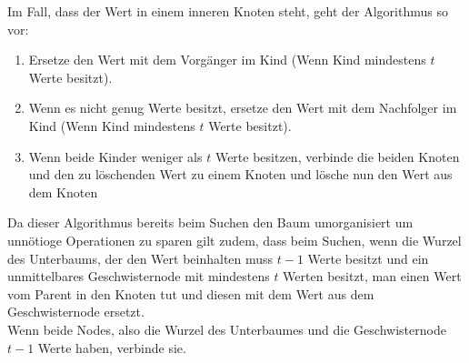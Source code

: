 \documentclass[
../../AuD-Zusammenfassung.tex,
]
{subfiles}
\begin{document}
\begin{minipage}[t]{\textwidth}
    \centering
    Im Fall, dass der Wert in einem inneren Knoten steht, geht der Algorithmus so vor:
    \begin{enumerate}
        \item Ersetze den Wert mit dem Vorgänger im Kind (Wenn Kind mindestens $t$ Werte besitzt).
        \item Wenn es nicht genug Werte besitzt, ersetze den Wert mit dem Nachfolger im Kind (Wenn Kind mindestens $t$ Werte besitzt).
        \item Wenn beide Kinder weniger als $t$ Werte besitzen, verbinde die beiden Knoten und den zu löschenden Wert zu einem Knoten und lösche nun den Wert aus dem Knoten
    \end{enumerate}
    Da dieser Algorithmus bereits beim Suchen den Baum umorganisiert um unnötioge Operationen zu sparen gilt zudem, dass beim Suchen, wenn die Wurzel des Unterbaums, der den Wert beinhalten muss $t - 1$ Werte besitzt und ein unmittelbares Geschwisternode mit mindestens $t$ Werten besitzt, man einen Wert vom Parent in den Knoten tut und diesen mit dem Wert aus dem Geschwisternode ersetzt.\\
    Wenn beide Nodes, also die Wurzel des Unterbaumes und die Geschwisternode $t - 1$ Werte haben, verbinde sie.
\end{minipage}

\end{document}

